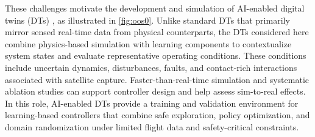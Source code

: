 \documentclass{ieeeaccess}
\begin{document}
These challenges motivate the development and simulation of AI-enabled digital twins 
(DTs) \cite{kaigom2025deep}, as illustrated in \cref{fig:oos0}. Unlike standard DTs that primarily mirror 
sensed real-time data from physical counterparts, the DTs considered here combine physics-based simulation 
with learning components to contextualize system states and evaluate representative operating conditions. 
These conditions include uncertain dynamics, disturbances, faults, and contact-rich interactions associated 
with satellite capture. Faster-than-real-time simulation and systematic ablation studies can support 
controller design and help assess sim-to-real effects. In this role, AI-enabled DTs provide a
training 
and validation environment for learning-based controllers that combine safe exploration, policy optimization, 
and domain randomization under limited flight data and safety-critical constraints.
\end{document}
